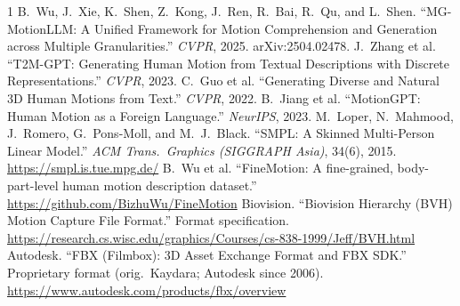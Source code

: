 \documentclass[10pt,twocolumn]{article}
\begin{document}
\begin{thebibliography}{1}
\small
{} B.~Wu, J.~Xie, K.~Shen, Z.~Kong, J.~Ren, R.~Bai, R.~Qu, and L.~Shen.
  ``MG-MotionLLM: A Unified Framework for Motion Comprehension and Generation across Multiple
  Granularities.'' \emph{CVPR}, 2025. arXiv:2504.02478.
 J.~Zhang et al. ``T2M-GPT: Generating Human Motion from Textual Descriptions with
  Discrete Representations.'' \emph{CVPR}, 2023.
 C.~Guo et al. ``Generating Diverse and Natural 3D Human Motions from Text.''
  \emph{CVPR}, 2022.
 B.~Jiang et al. ``MotionGPT: Human Motion as a Foreign Language.''
  \emph{NeurIPS}, 2023.
 M.~Loper, N.~Mahmood, J.~Romero, G.~Pons-Moll, and M.~J.~Black.
  ``SMPL: A Skinned Multi-Person Linear Model.'' \emph{ACM Trans.\ Graphics (SIGGRAPH Asia)},
  34(6), 2015. \url{https://smpl.is.tue.mpg.de/}
 B.~Wu et al. ``FineMotion: A fine-grained, body-part-level human motion
  description dataset.'' \url{https://github.com/BizhuWu/FineMotion}
 Biovision. ``Biovision Hierarchy (BVH) Motion Capture File Format.''
  Format specification. \url{https://research.cs.wisc.edu/graphics/Courses/cs-838-1999/Jeff/BVH.html}
 Autodesk. ``FBX (Filmbox): 3D Asset Exchange Format and FBX SDK.''
  Proprietary format (orig.\ Kaydara; Autodesk since 2006).
  \url{https://www.autodesk.com/products/fbx/overview}
\end{thebibliography}
\end{document}
